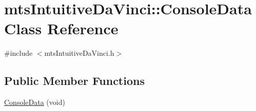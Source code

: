 \hypertarget{classmts_intuitive_da_vinci_1_1_console_data}{\section{mts\-Intuitive\-Da\-Vinci\-:\-:Console\-Data Class Reference}
\label{classmts_intuitive_da_vinci_1_1_console_data}
}


{\ttfamily \#include $<$mts\-Intuitive\-Da\-Vinci.\-h$>$}

\subsection*{Public Member Functions}
\begin{DoxyCompactItemize}
\item 
\hyperlink{classmts_intuitive_da_vinci_1_1_console_data_a7b3e663d83ad3cb5b899c4fd87e30bcd}{Console\-Data} (void)
\end{DoxyCompactItemize}

